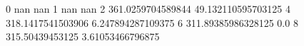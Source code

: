 0 nan nan
1 nan nan
2 361.0259704589844 49.132110595703125
4 318.1417541503906 6.247894287109375
6 311.89385986328125 0.0
8 315.50439453125 3.61053466796875
